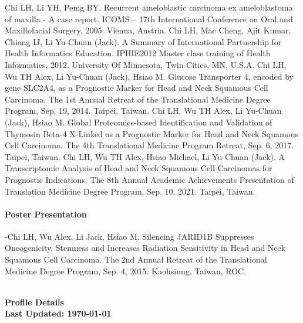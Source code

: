 \begin{vita}
\begin{outline}
\1 Chi LH, Li YH, Pemg BY. Recurrent ameloblastic carcinoma ex ameloblastoma of maxilla - A case report. ICOMS – 17th International Conference on Oral and Maxillofacial Surgery, 2005. Vienna, Austria.
\1 Chi LH, Mac Cheng, Ajit Kumar, Chiang IJ, Li Yu-Chuan (Jack). A Summary of International Partnership for Health Informatics Education. IPHIE2012 Master class training of Health Informatics, 2012. University Of Minnesota, Twin Cities, MN, U.S.A.
\1 Chi LH, Wu TH Alex, Li Yu-Chuan (Jack), Hsiao M. Glucose Transporter 4, encoded by gene SLC2A4, as a Prognostic Marker for Head and Neck Squamous Cell Carcinoma. The 1st Annual Retreat of the Translational Medicine Degree Program, Sep. 19, 2014. Taipei, Taiwan.
\1 Chi LH, Wu TH Alex, Li Yu-Chuan (Jack), Hsiao M. Global Proteomics-based Identification and Validation of Thymosin Beta-4 X-Linked as a Prognostic Marker for Head and Neck Squamous Cell Carcinoma. The 4th Translational Medicine Program Retreat, Sep. 6, 2017. Taipei, Taiwan.
\1 Chi LH, Wu TH Alex, Hsiao Michael, Li Yu-Chuan (Jack). A Transcriptomic Analysis of Head and Neck Squamous Cell Carcinomas for Prognostic Indications. The 8th Annual Academic Achievements Presentation of Translation Medicine Degree Program, Sep. 10, 2021. Taipei, Taiwan.
\end{outline}

\paragraph*{Poster Presentation}

-Chi LH, Wu Alex, Li Jack, Hsiao M. Silencing JARID1B Suppresses Oncogenicity, Stemness and Increases Radiation Sensitivity in Head and Neck Squamous Cell Carcinoma. The 2nd Annual Retreat of the Translational Medicine Degree Program, Sep. 4, 2015. Kaohsiung, Taiwan, ROC. 

\textbf{\\
Profile Details \\
Last Updated: \today}

\end{vita}